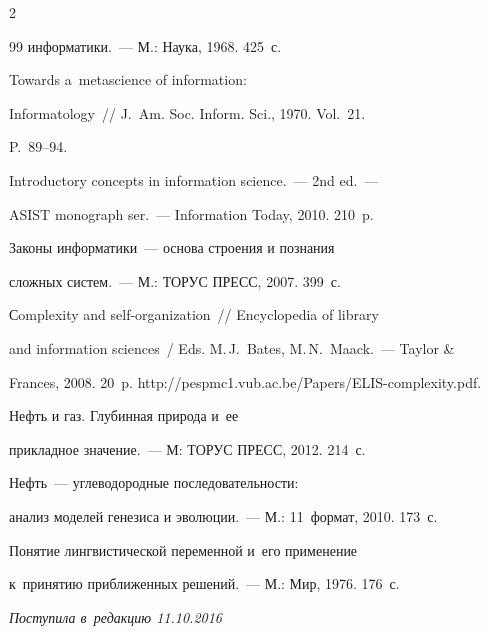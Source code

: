 \begin{multicols}{2}
{{\begin{thebibliography}{99}
информатики.~--- М.: Наука, 1968. 425~с.


 Towards a~metascience of information: 

Informatology~// J.~Am. Soc. Inform. Sci., 1970. Vol.~21.  

P.~89--94.


 Introductory concepts in information science.~--- 2nd ed.~--- 

ASIST monograph ser.~--- Information Today, 2010. 210~p.


 Законы информатики~--- основа строения и познания 

сложных систем.~--- М.: ТОРУС ПРЕСС, 2007. 399~с.


 Сomplexity and self-organization~// Encyclopedia of library 

and information sciences~/ Eds. M.\,J.~Bates, M.\,N.~Maack.~--- Taylor \& 

Frances, 2008. 20~p. {\sf http://pespmc1.vub.ac.be/Papers/ELIS-complexity.pdf}.


 Нефть и газ. Глубинная природа и~ее 

прикладное значение.~--- М: ТОРУС ПРЕСС, 2012. 214~с.


 Нефть~--- углеводородные последовательности: 

анализ моделей генезиса и эволюции.~--- М.: 11~формат, 2010. 173~с.


 Понятие лингвистической переменной и~его применение 

к~принятию приближенных решений.~--- М.: Мир, 1976. 176~с.



\end{thebibliography}

} }



\end{multicols}



 \label{end\stat}



 \vspace*{-3pt}



\hfill{\small\textit{Поступила в~редакцию  11.10.2016}}


\renewcommand{\figurename}{\protect\bf Рис.}

\renewcommand{\tablename}{\protect\bf Таблица} 

